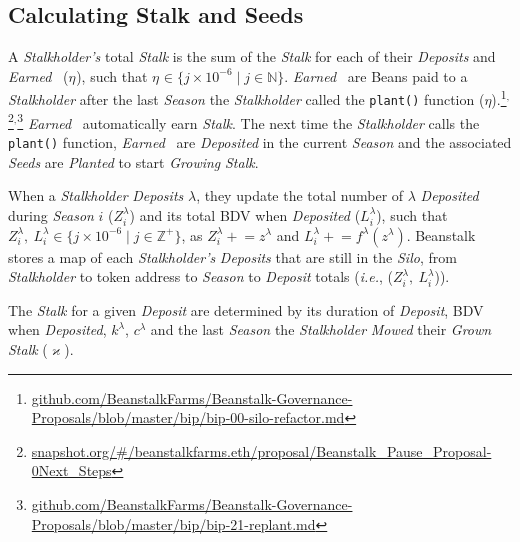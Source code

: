 \documentclass[tikz]{article}
\newcommand{\code}[1]{\texttt{#1}}
\newcommand{\term}[1]{\textsl{#1}}
\newcommand{\Bean}{} %
\newcommand{\bean}{} %
\begin{document}
\subsection{Calculating Stalk and Seeds}
A \term{Stalkholder's} total \term{Stalk} is the sum of the \term{Stalk} for each of their \term{Deposits} and \term{Earned} \Bean\ ($\eta^{\bean}$), such that $\eta^{\bean} \in \{j \times 10^{-6} \mid j \in \mathbb{N} \}$. 
\term{Earned} \Bean\ are Beans paid to a \term{Stalkholder} after the last \term{Season} the \term{Stalkholder} called the \code{plant()} function ($\eta$).\footnote{\href{https://github.com/BeanstalkFarms/Beanstalk-Governance-Proposals/blob/master/bip/bip-00-silo-refactor.md}{github.com/BeanstalkFarms/Beanstalk-Governance-Proposals/blob/master/bip/bip-00-silo-refactor.md}}$^{,}$\footnote{\href{https://snapshot.org/\#/beanstalkfarms.eth/proposal/0xffc6033eb5a4e53f4da5df1c4011bacc12244914885fe11e6a6f2d09d856feed}{snapshot.org/\#/beanstalkfarms.eth/proposal/Beanstalk\_Pause\_Proposal-0\:Next\_Steps}}$^{,}$\footnote{\href{https://github.com/BeanstalkFarms/Beanstalk-Governance-Proposals/blob/master/bip/bip-21-replant.md}{github.com/BeanstalkFarms/Beanstalk-Governance-Proposals/blob/master/bip/bip-21-replant.md}} \term{Earned} \Bean\ automatically earn \term{Stalk}. The next time the \term{Stalkholder} calls the \code{plant()} function, \term{Earned} \Bean\ are \term{Deposited} in the current \term{Season} and the associated \term{Seeds} are \term{Planted} to start \term{Growing} \term{Stalk}.

When a \term{Stalkholder} \term{Deposits} $\lambda$, they update the total number of $\lambda$ \term{Deposited} during \term{Season} $i$ ($Z_i^{\lambda}$) and its total BDV when \term{Deposited} ($L_i^{\lambda}$), such that $Z_i^{\lambda},\ L_i^{\lambda} \in \{j \times 10^{-6} \mid j \in \mathbb{Z}^{+} \}$, as $Z_i^{\lambda} \mathrel{+}= z^{\lambda}$ and $L_i^{\lambda} \mathrel{+}= f^{\lambda}(z^{\lambda})$. Beanstalk stores a map of each \term{Stalkholder's} \term{Deposits} that are still in the \term{Silo}, from \term{Stalkholder} to token address to \term{Season} to \term{Deposit} totals (\term{i.e.}, ($Z_i^{\lambda},\ L_i^{\lambda}$)).

The \term{Stalk} for a given \term{Deposit} are determined by its duration of \term{Deposit}, BDV when \term{Deposited}, $k^{\lambda}$, $c^{\lambda}$ and the last \term{Season} the \term{Stalkholder} \term{Mowed} their \term{Grown} \term{Stalk} ($\varkappa$).
\end{document}
